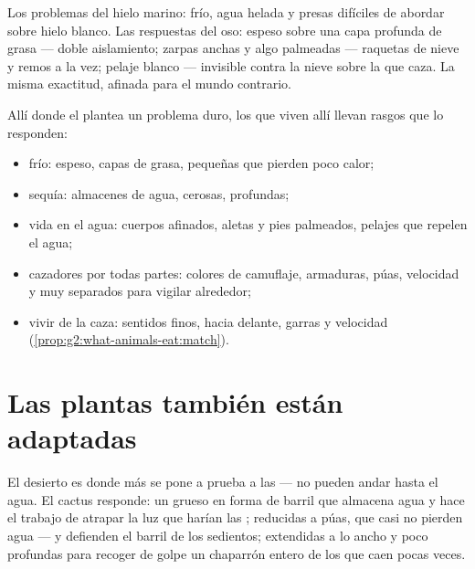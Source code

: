 \begin{example}\label{ex:g4:adapted-to-their-world:bear}
Los problemas del hielo marino: frío, agua helada y presas difíciles
de abordar sobre hielo blanco. Las respuestas del oso:  espeso
sobre una capa profunda de grasa --- doble aislamiento; zarpas anchas
y algo palmeadas --- raquetas de nieve y remos a la vez; pelaje
blanco --- invisible contra la nieve sobre la que caza. La misma
exactitud, afinada para el mundo contrario.
\end{example}

\begin{proposition}\label{prop:g4:adapted-to-their-world:answers}
Allí donde el  plantea un problema duro, los  que
viven allí llevan rasgos que lo responden:
\begin{itemize}
  \item frío:  espeso, capas de grasa,  pequeñas que pierden
        poco calor;
  \item sequía: almacenes de agua,  cerosas,  profundas;
  \item vida en el agua: cuerpos afinados, aletas y pies palmeados,
        pelajes que repelen el agua;
  \item cazadores por todas partes: colores de camuflaje, armaduras,
        púas, velocidad y  muy separados para vigilar alrededor;
  \item vivir de la caza: sentidos finos,  hacia delante, garras y
        velocidad (\cref{prop:g2:what-animals-eat:match}).
\end{itemize}
\end{proposition}
\admitted

\section{Las plantas también están adaptadas}

\begin{example}[El cactus]\label{ex:g4:adapted-to-their-world:cactus}
El desierto es donde más se pone a prueba a las  --- no pueden
andar hasta el agua. El cactus responde: un  grueso en forma de
barril que almacena agua y hace el trabajo de atrapar la luz que
harían las ;  reducidas a púas, que casi no pierden agua ---
y defienden el barril de los  sedientos;  extendidas a
lo ancho y poco profundas para recoger de golpe un chaparrón entero de
los que caen pocas veces.
\end{example}

